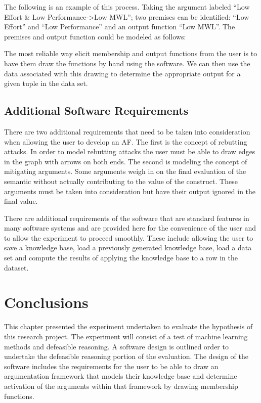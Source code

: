 The following is an example of this process. Taking the argument labeled ``Low Effort & Low Performance->Low MWL''; two premises can be identified: ``Low Effort'' and ``Low Performance'' and an output function ``Low MWL''. The premises and output function could be modeled as follows:




The most reliable way elicit membership and output functions from the user is to have them draw the functions by hand using the software. We can then use the data associated with this drawing to determine the appropriate output for a given tuple in the data set.

\subsection{Additional Software Requirements}

There are two additional requirements that need to be taken into consideration when allowing the user to develop an AF. The first is the concept of rebutting attacks. In order to model rebutting attacks the user must be able to draw edges in the graph with arrows on both ends. The second is modeling the concept of mitigating arguments. Some arguments weigh in on the final evaluation of the semantic without actually contributing to the value of the construct. These arguments must be taken into consideration but have their output ignored in the final value. 


There are additional requirements of the software that are standard features in many software systems and are provided here for the convenience of the user and to allow the experiment to proceed smoothly. These include allowing the user to save a knowledge base, load a previously generated knowledge base, load a data set and compute the results of applying the knowledge base to a row in the dataset.


\section{Conclusions}


This chapter presented the experiment undertaken to evaluate the hypothesis of this research project. The experiment will consist of a test of machine learning methods and defeasible reasoning. A software design is outlined order to undertake the defeasible reasoning portion of the evaluation. The design of the software includes the requirements for the user to be able to draw an argumentation framework that models their knowledge base and determine activation of the arguments within that framework by drawing membership functions.